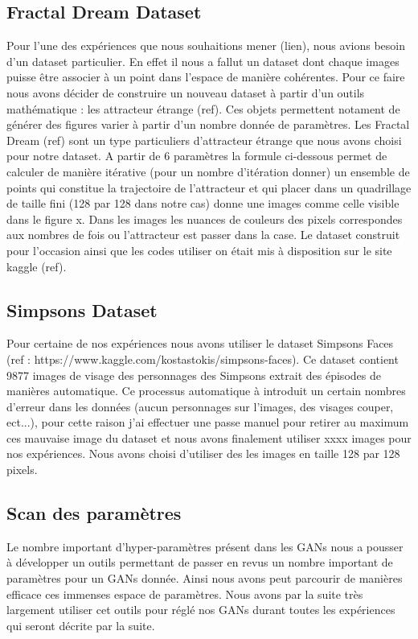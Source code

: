 \documentclass[11pt,francais]{article}
\begin{document}
\subsection{Fractal Dream Dataset}
Pour l'une des expériences que nous souhaitions mener (lien), nous avions besoin d'un dataset particulier.
En effet il nous a fallut un dataset dont chaque images puisse être associer à un point dans l'espace de manière cohérentes.
Pour ce faire nous avons décider de construire un nouveau dataset à partir d'un outils mathématique : les attracteur étrange (ref). Ces objets permettent notament de générer des figures varier à partir d'un nombre donnée de paramètres.
Les Fractal Dream (ref) sont un type particuliers d'attracteur étrange que nous avons choisi pour notre dataset. A partir de 6 paramètres la formule ci-dessous permet de calculer de manière itérative (pour un nombre d'itération donner) un ensemble de points qui constitue la trajectoire de l'attracteur et qui placer dans un quadrillage de taille fini (128 par 128 dans notre cas) donne une images comme celle visible dans le figure x. Dans les images les nuances de couleurs des pixels correspondes aux nombres de fois ou l'attracteur est passer dans la case.
Le dataset construit pour l'occasion ainsi que les codes utiliser on était mis à disposition sur le site kaggle (ref).

\subsection{Simpsons Dataset}
Pour certaine de nos expériences nous avons utiliser le dataset Simpsons Faces (ref : https://www.kaggle.com/kostastokis/simpsons-faces). Ce dataset contient 9877 images de visage des personnages des Simpsons extrait des épisodes de manières automatique. Ce processus  automatique à introduit un certain nombres d'erreur dans les données (aucun personnages sur l'images, des visages couper, ect...), pour cette raison j'ai effectuer une passe manuel pour retirer au maximum ces mauvaise image du dataset et nous avons finalement utiliser xxxx images pour nos expériences.
Nous avons choisi d'utiliser des les images en taille 128 par 128 pixels.

\subsection{Scan des paramètres}
Le nombre important d'hyper-paramètres présent dans les GANs nous a pousser à développer un outils permettant de passer en revus un nombre important de paramètres pour un GANs donnée. Ainsi nous avons peut parcourir de manières efficace ces immenses espace de paramètres.
Nous avons par la suite très largement utiliser cet outils pour réglé nos GANs durant toutes les expériences qui seront décrite par la suite. 
\end{document}
